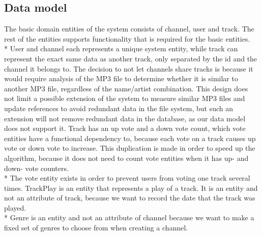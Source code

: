 \documentclass[a4paper,11pt,report]{article}
\begin{document}
\subsection{Data model}
The basic domain entities of the system consists of channel, user and track. The rest of the entities supports functionality that is required for the basic entities. \\*
User and channel each represents a unique system entity, while track can represent the exact same data as another track, only separated by the id and the channel it belongs to.
The decision to not let channels share tracks is because it would require analysis of the MP3 file to determine whether it is similar to another MP3 file, regardless of the name/artist combination.
This design does not limit a possible extension of the system to measure similar MP3 files and update references to avoid redundant data in the file system, but such an extension will not remove redundant data in the database, as our data model does not support it. 
Track has an up vote and a down vote count, which vote entities have a functional dependency to, because each vote on a track causes up vote or down vote to increase. This duplication is made in order to speed up the algorithm, because it does not need to count vote entities when it has up- and down- vote counters. \\*
The vote entity exists in order to prevent users from voting one track several times.
TrackPlay is an entity that represents a play of a track. It is an entity and not an attribute of track, because we want to record the date that the track was played. \\*
Genre is an entity and not an attribute of channel because we want to make a fixed set of genres to choose from when creating a channel.
\end{document}
